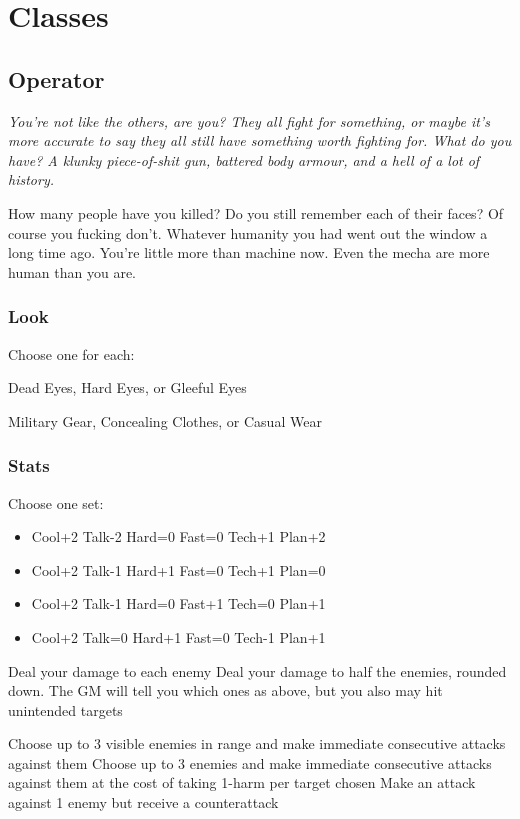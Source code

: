 \section{Classes}

\subsection{Operator}
{\itshape You're not like the others, are you? They all fight for something, or maybe it's more accurate to say they all still have something worth fighting for. What do you have? A klunky piece-of-shit gun, battered body armour, and a hell of a lot of history. 

How many people have you killed? Do you still remember each of their faces? Of course you fucking don't. Whatever humanity you had went out the window a long time ago. You're little more than machine now. Even the mecha are more human than you are.}

\subsubsection{Look}

Choose one for each:

Dead Eyes, Hard Eyes, or Gleeful Eyes

Military Gear, Concealing Clothes, or Casual Wear

\subsubsection{Stats}
Choose one set:
\begin{itemize}
\setlength\itemsep{0em}
\item Cool+2 Talk-2 Hard=0 Fast=0 Tech+1 Plan+2
\item Cool+2 Talk-1 Hard+1 Fast=0 Tech+1 Plan=0
\item Cool+2 Talk-1 Hard=0 Fast+1 Tech=0 Plan+1
\item Cool+2 Talk=0 Hard+1 Fast=0 Tech-1 Plan+1
\end{itemize}

{Deal your damage to each enemy}
{Deal your damage to half the enemies, rounded down. The GM will tell you which ones}
{as above, but you also may hit unintended targets}

{Choose up to 3 visible enemies in range and make immediate consecutive attacks against them}
{Choose up to 3 enemies and make immediate consecutive attacks against them at the cost of taking 1-harm per target chosen}
{Make an attack against 1 enemy but receive a counterattack}

